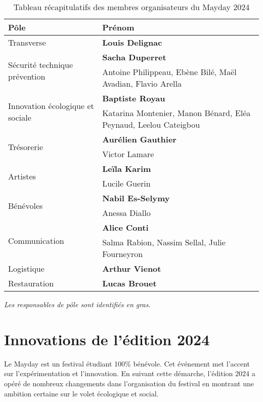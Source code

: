 \documentclass[12pt,a4paper]{report}
\begin{document}
\begin{table}[h!]
\centering
\begin{tabular}{|m{3cm}|m{10cm}|}
\hline
Pôle & Prénom \\ 
 \hline\hline
Transverse & \textbf{Louis Delignac}\\ 
\hline
\multirow{2}{10em}{Sécurité technique prévention} & \textbf{Sacha Duperret} \\ 
& Antoine Philippeau, Ebène Bilé, Maël Avadian, Flavio Arella\\ 
 \hline
 \multirow{2}{5em}{Innovation écologique et sociale} & \textbf{Baptiste Royau} \\ 
& Katarina Montenier, Manon Bénard, Eléa Peynaud, Leelou Cateigbou\\
 \hline
 \multirow{2}{5em}{Trésorerie} & \textbf{Aurélien Gauthier} \\ 
& Victor Lamare\\
 \hline
 \multirow{2}{5em}{Artistes} & \textbf{Leïla Karim} \\
& Lucile Guerin\\
 \hline
\multirow{2}{5em}{Bénévoles} & \textbf{Nabil Es-Selymy} \\ 
& Anessa Diallo\\
 \hline
\multirow{2}{7em}{Communication} & \textbf{Alice Conti} \\ 
& Salma Rabion, Nassim Sellal, Julie Fourneyron\\
 \hline
 \multirow{1}{5em}{Logistique} & \textbf{Arthur Vienot} \\ 
 \hline
 \multirow{1}{5em}{Restauration} & \textbf{Lucas Brouet} \\ 
 \hline
\end{tabular}
\caption{Tableau récapitulatifs des membres organisateurs du Mayday 2024}
\label{tab:team}
\end{table}

\textit{Les responsables de pôle sont identifiés en gras.}

\chapter{Innovations de l'édition 2024}

Le Mayday est un festival étudiant 100\% bénévole. Cet événement met l’accent sur l’expérimentation et l’innovation. En suivant cette démarche, l’édition 2024 a opéré de nombreux changements dans l’organisation du festival en montrant une ambition certaine sur le volet écologique et social.
\end{document}
